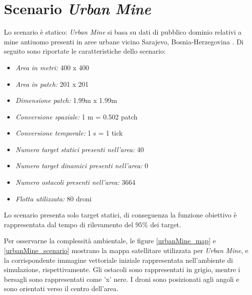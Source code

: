 \section{Scenario \textit{Urban Mine}}

Lo scenario è statico: \textit{Urban Mine} si basa su dati di pubblico dominio relativi a mine antiuomo presenti in aree urbane vicino Sarajevo, Bosnia-Herzegovina \cite{seedemining2018}.
Di seguito sono riportate le caratteristiche dello scenario:

\begin{itemize}
    \item \textit{Area in metri:} 400 x 400
    \item \textit{Area in patch:} 201 x 201
    \item \textit{Dimensione patch:} 1.99m x 1.99m
    \item \textit{Conversione spaziale:} 1 m = 0.502 patch
    \item \textit{Conversione temporale:} 1 s = 1 tick
    \item \textit{Numero target statici presenti nell'area:} 40
    \item \textit{Numero target dinamici presenti nell'area:} 0
    \item \textit{Numero ostacoli presenti nell'area:} 3664
    \item \textit{Flotta utilizzata:} 80 droni
\end{itemize}

Lo scenario presenta solo target statici, di conseguenza la funzione obiettivo è rappresentata dal tempo di rilevamento del $95 \%$ dei target.

Per osservarne la complessità ambientale, le figure \ref{urbanMine_map} e \ref{urbanMine_scenario} mostrano la mappa satellitare utilizzata per \textit{Urban Mine}, e la corrispondente immagine vettoriale iniziale rappresentata nell'ambiente di simulazione, rispettivamente. 
Gli ostacoli  sono rappresentati in grigio, mentre i bersagli sono rappresentati come 'x' nere. 
I droni sono posizionati agli angoli e sono orientati verso il centro dell'area.

